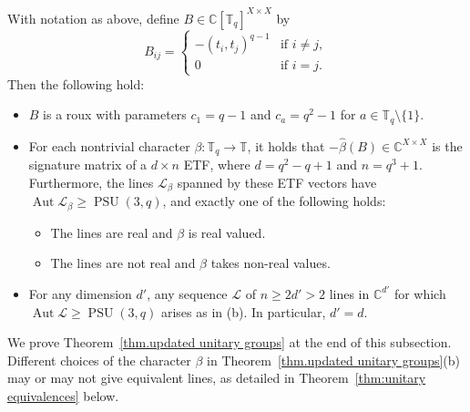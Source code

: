\begin{theorem}
\label{thm.updated unitary groups}
With notation as above, define $B\in\mathbb{C}[\mathbb{T}_q]^{X\times X}$ by
\[
B_{ij}=
\begin{cases}
-(t_i,t_j)^{q-1} & \text{if } i\neq j,\\
0 & \text{if }i=j.
\end{cases}
\]
Then the following hold:
\begin{itemize}
\item[(a)]
$B$ is a roux with parameters $c_1=q-1$ and $c_a=q^2-1$ for  $a\in\mathbb{T}_q\setminus\{1\}$.
\item[(b)]
For each nontrivial character $\beta\colon\mathbb{T}_q\to\mathbb{T}$, it holds that $-\hat\beta(B)\in\mathbb{C}^{X\times X}$ is the signature matrix of a $d\times n$ ETF, where $d=q^2-q+1$ and $n=q^3+1$.
Furthermore, the lines $\mathscr{L}_\beta$ spanned by these ETF vectors have $\operatorname{Aut}\mathscr{L}_\beta\geq\operatorname{PSU}(3,q)$, and exactly one of the following holds:
\begin{itemize}
\item[(i)]
The lines are real and $\beta$ is real valued.
\item[(ii)]
The lines are not real and $\beta$ takes non-real values.
\end{itemize}
\item[(c)]
For any dimension $d'$, any sequence $\mathscr{L}$ of $n\geq 2d'>2$ lines in $\mathbb{C}^{d'}$ for which $\operatorname{Aut}\mathscr{L}\geq\operatorname{PSU}(3,q)$ 
arises as in (b).
In particular, $d' = d$.
\end{itemize}
\end{theorem}


We prove Theorem~\ref{thm.updated unitary groups} at the end of this subsection.
Different choices of the character $\beta$ in Theorem~\ref{thm.updated unitary groups}(b) may or may not give equivalent lines, as detailed in Theorem~\ref{thm:unitary equivalences} below.


